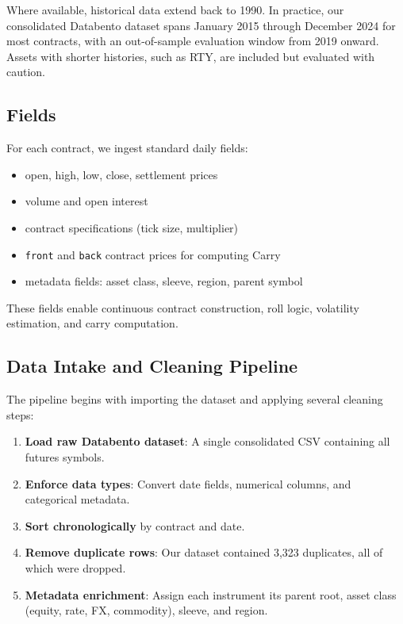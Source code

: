 \documentclass{article}
\begin{document}
Where available, historical data extend back to 1990. In practice, our consolidated Databento dataset spans
January 2015 through December 2024 for most contracts, with an out-of-sample evaluation window from
2019 onward. Assets with shorter histories, such as RTY, are included but evaluated with caution.

\subsection{Fields}

For each contract, we ingest standard daily fields:

\begin{itemize}
    \item open, high, low, close, settlement prices
    \item volume and open interest
    \item contract specifications (tick size, multiplier)
    \item \texttt{front} and \texttt{back} contract prices for computing Carry
    \item metadata fields: asset class, sleeve, region, parent symbol
\end{itemize}

These fields enable continuous contract construction, roll logic, volatility estimation, and carry computation.

\subsection{Data Intake and Cleaning Pipeline}

The pipeline begins with importing the dataset and applying several cleaning steps:

\begin{enumerate}
    \item \textbf{Load raw Databento dataset}: A single consolidated CSV containing all futures symbols.
    \item \textbf{Enforce data types}: Convert date fields, numerical columns, and categorical metadata.
    \item \textbf{Sort chronologically} by contract and date.
    \item \textbf{Remove duplicate rows}: Our dataset contained 3,323 duplicates, all of which were dropped.
    \item \textbf{Metadata enrichment}: Assign each instrument its parent root, asset class (equity, rate, FX, commodity),
          sleeve, and region.
\end{enumerate}
\end{document}
